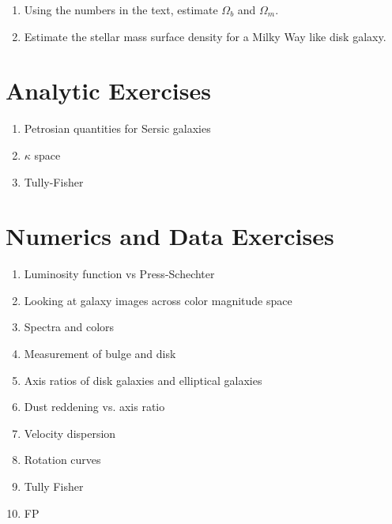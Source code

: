 \begin{enumerate} 
\item Using the numbers in the text, estimate $\Omega_b$ and
    $\Omega_m$. 
\item Estimate the stellar mass surface density for a Milky Way like
disk galaxy.
\end{enumerate} 

\section{Analytic Exercises}

\begin{enumerate}
\item Petrosian quantities for Sersic galaxies
\item $\kappa$ space
\item Tully-Fisher
\end{enumerate}

\section{Numerics and Data Exercises}

\begin{enumerate}
\item Luminosity function vs Press-Schechter
\item Looking at galaxy images across color magnitude space
\item Spectra and colors
\item Measurement of bulge and disk 
\item Axis ratios of disk galaxies and elliptical galaxies
\item Dust reddening vs. axis ratio
\item Velocity dispersion
\item Rotation curves
\item Tully Fisher
\item FP
\end{enumerate}


  
